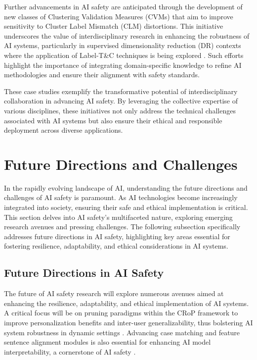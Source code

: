 Further advancements in AI safety are anticipated through the development of new classes of Clustering Validation Measures (CVMs) that aim to improve sensitivity to Cluster Label Mismatch (CLM) distortions. This initiative underscores the value of interdisciplinary research in enhancing the robustness of AI systems, particularly in supervised dimensionality reduction (DR) contexts where the application of Label-T&C techniques is being explored \cite{jeon2023classesclustersimprovinglabelbased}. Such efforts highlight the importance of integrating domain-specific knowledge to refine AI methodologies and ensure their alignment with safety standards.



These case studies exemplify the transformative potential of interdisciplinary collaboration in advancing AI safety. By leveraging the collective expertise of various disciplines, these initiatives not only address the technical challenges associated with AI systems but also ensure their ethical and responsible deployment across diverse applications.













\section{Future Directions and Challenges} \label{sec:Future Directions and Challenges}

In the rapidly evolving landscape of AI, understanding the future directions and challenges of AI safety is paramount. As AI technologies become increasingly integrated into society, ensuring their safe and ethical implementation is critical. This section delves into AI safety's multifaceted nature, exploring emerging research avenues and pressing challenges. The following subsection specifically addresses future directions in AI safety, highlighting key areas essential for fostering resilience, adaptability, and ethical considerations in AI systems.

\subsection{Future Directions in AI Safety} \label{subsec:Future Directions in AI Safety}

The future of AI safety research will explore numerous avenues aimed at enhancing the resilience, adaptability, and ethical implementation of AI systems. A critical focus will be on pruning paradigms within the CRoP framework to improve personalization benefits and inter-user generalizability, thus bolstering AI system robustness in dynamic settings \cite{kaur2024cropcontextwiserobuststatic}. Advancing case matching and feature sentence alignment modules is also essential for enhancing AI model interpretability, a cornerstone of AI safety \cite{lin2023interpretabilityframeworksimilarcase}.

